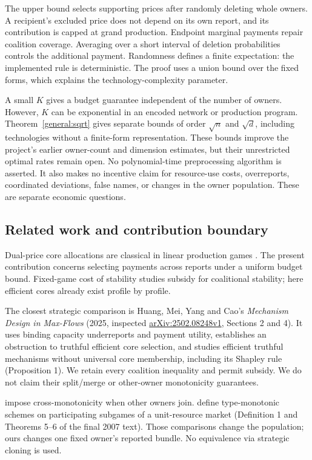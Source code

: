 \documentclass[11pt]{article}
\theoremstyle{definition}\newtheorem{definition}[theorem]{Definition}
\theoremstyle{remark}\newtheorem{remark}[theorem]{Remark}
\begin{document}
The upper bound selects supporting prices after randomly deleting whole
owners. A recipient's excluded price does not depend on its own report, and
its contribution is capped at grand production. Endpoint marginal payments
repair coalition coverage. Averaging over a short interval of deletion
probabilities controls the additional payment. Randomness defines a finite
expectation: the implemented rule is deterministic. The proof uses a union
bound over the fixed forms, which explains the technology-complexity parameter.

A small $K$ gives a budget guarantee independent of the number of owners.
However, $K$ can be exponential in an encoded network or production program.
Theorem~\ref{general:sqrt} gives separate bounds of order $\sqrt n$ and
$\sqrt d$, including technologies without a finite-form representation.
These bounds improve the project's earlier owner-count and dimension estimates,
but their unrestricted optimal rates remain open. No polynomial-time
preprocessing algorithm is asserted. It also makes no incentive claim for resource-use
costs, overreports, coordinated deviations, false names, or changes in the
owner population. These are separate economic questions.

\subsection{Related work and contribution boundary}
Dual-price core allocations are classical in linear production games
\citep{Owen,SametZemel}. The present contribution concerns selecting payments
across reports under a uniform budget bound. Fixed-game cost of stability
\citep{Bachrach} studies subsidy for coalitional stability; here efficient
cores already exist profile by profile.

The closest strategic comparison is Huang, Mei, Yang and Cao's
\emph{Mechanism Design in Max-Flows} (2025, inspected
\href{https://arxiv.org/html/2502.08248v1}{arXiv:2502.08248v1}, Sections 2 and 4).
It uses binding capacity underreports and payment utility, establishes an
obstruction to truthful efficient core selection, and studies efficient
truthful mechanisms without universal core membership, including its Shapley
rule (Proposition 1). We retain every coalition
inequality and permit subsidy. We do not claim their split/merge or
other-owner monotonicity guarantees.

\citet{Immorlica} impose cross-monotonicity when other owners join.
\citet{Branzei} define type-monotonic schemes on participating subgames of a
unit-resource market (Definition 1 and Theorems 5--6 of the final 2007 text).
Those comparisons change the population; ours changes one fixed owner's
reported bundle. No equivalence via strategic cloning is used.
\end{document}
